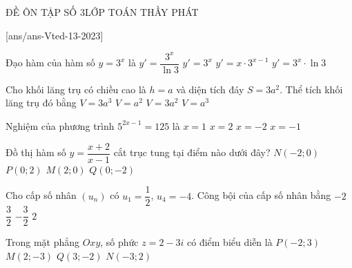 \begin{name}
	{\tenchude}{ĐỀ ÔN TẬP SỐ 3}{LỚP TOÁN THẦY PHÁT}{\thoigian}
\end{name}
\setcounter{ex}{0}
\setcounter{bt}{0}
[ans/ans-Vted-13-2023]
\begin{ex}%
	Đạo hàm của hàm số $y=3^x$ là
	\choice 
	{$y'=\dfrac{3^x}{\ln 3}$}
	{$y'=3^x$}
	{$y'=x\cdot 3^{x-1}$}
	{\True $y'=3^x\cdot \ln 3$}
\end{ex}	
\begin{ex}%
	Cho khối lăng trụ có chiều cao là $h=a$ và diện tích đáy $S=3a^2$. Thể tích khối lăng trụ đó bằng
	\choice 
	{\True $V=3a^3$}
	{$V=a^2$}
	{$V=3a^2$}
	{$V=a^3$}
\end{ex}
\begin{ex}%
	Nghiệm của phương trình $5^{2x-1}=125$ là
	\choice 
	{$x=1$}
	{\True $x=2$}
	{$x=-2$}
	{$x=-1$}
\end{ex}
\begin{ex}%
	Đồ thị hàm số $y=\dfrac{x+2}{x-1}$ cắt trục tung tại điểm nào dưới đây?
	\choice 
	{$N(-2;0)$}
	{$P(0;2)$}
	{$M(2;0)$}
	{\True $Q(0;-2)$}
\end{ex}
\begin{ex}%
	Cho cấp số nhân $(u_n)$ có $u_1=\dfrac{1}{2}$, $u_4=-4$. Công bội của cấp số nhân bằng
	\choice 
	{\True $-2$}
	{$\dfrac{3}{2}$}
	{$-\dfrac{3}{2}$}
	{$2$}
\end{ex}
\begin{ex}%
	Trong mặt phẳng $Oxy$, số phức $z=2-3i$ có điểm biểu diễn là
	\choice 
	{$P(-2;3)$}
	{\True $M(2;-3)$}
	{$Q(3;-2)$}
	{$N(-3;2)$}
\end{ex}
